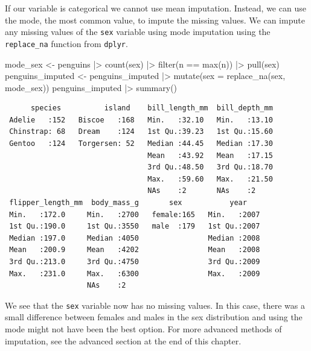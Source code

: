 \documentclass[
  letterpaper,
  DIV=11,
  numbers=noendperiod]{scrreprt}
\newenvironment{Shaded}{\begin{snugshade}}{\end{snugshade}}
\newcommand{\AttributeTok}[1]{\textcolor[rgb]{0.40,0.45,0.13}{#1}}
\newcommand{\FunctionTok}[1]{\textcolor[rgb]{0.28,0.35,0.67}{#1}}
\newcommand{\NormalTok}[1]{\textcolor[rgb]{0.00,0.23,0.31}{#1}}
\newcommand{\OtherTok}[1]{\textcolor[rgb]{0.00,0.23,0.31}{#1}}
\newcommand{\SpecialCharTok}[1]{\textcolor[rgb]{0.37,0.37,0.37}{#1}}
\begin{document}
If our variable is categorical we cannot use mean imputation. Instead,
we can use the mode, the most common value, to impute the missing
values. We can impute any missing values of the \texttt{sex} variable
using mode imputation using the \texttt{replace\_na} function from
\texttt{dplyr}.

\begin{Shaded}
\begin{Highlighting}[]
\NormalTok{mode\_sex }\OtherTok{\textless{}{-}}\NormalTok{ penguins }\SpecialCharTok{|\textgreater{}}
  \FunctionTok{count}\NormalTok{(sex) }\SpecialCharTok{|\textgreater{}}
  \FunctionTok{filter}\NormalTok{(n }\SpecialCharTok{==} \FunctionTok{max}\NormalTok{(n)) }\SpecialCharTok{|\textgreater{}}
  \FunctionTok{pull}\NormalTok{(sex)}
\NormalTok{penguins\_imputed }\OtherTok{\textless{}{-}}\NormalTok{ penguins\_imputed }\SpecialCharTok{|\textgreater{}} 
  \FunctionTok{mutate}\NormalTok{(}\AttributeTok{sex =} \FunctionTok{replace\_na}\NormalTok{(sex, mode\_sex))}
\NormalTok{penguins\_imputed }\SpecialCharTok{|\textgreater{}} \FunctionTok{summary}\NormalTok{()}
\end{Highlighting}
\end{Shaded}

\begin{verbatim}
      species          island    bill_length_mm  bill_depth_mm  
 Adelie   :152   Biscoe   :168   Min.   :32.10   Min.   :13.10  
 Chinstrap: 68   Dream    :124   1st Qu.:39.23   1st Qu.:15.60  
 Gentoo   :124   Torgersen: 52   Median :44.45   Median :17.30  
                                 Mean   :43.92   Mean   :17.15  
                                 3rd Qu.:48.50   3rd Qu.:18.70  
                                 Max.   :59.60   Max.   :21.50  
                                 NAs    :2       NAs    :2      
 flipper_length_mm  body_mass_g       sex           year     
 Min.   :172.0     Min.   :2700   female:165   Min.   :2007  
 1st Qu.:190.0     1st Qu.:3550   male  :179   1st Qu.:2007  
 Median :197.0     Median :4050                Median :2008  
 Mean   :200.9     Mean   :4202                Mean   :2008  
 3rd Qu.:213.0     3rd Qu.:4750                3rd Qu.:2009  
 Max.   :231.0     Max.   :6300                Max.   :2009  
                   NAs    :2                                 
\end{verbatim}

We see that the \texttt{sex} variable now has no missing values. In this
case, there was a small difference between females and males in the sex
distribution and using the mode might not have been the best option. For
more advanced methods of imputation, see the advanced section at the end
of this chapter.
\end{document}

